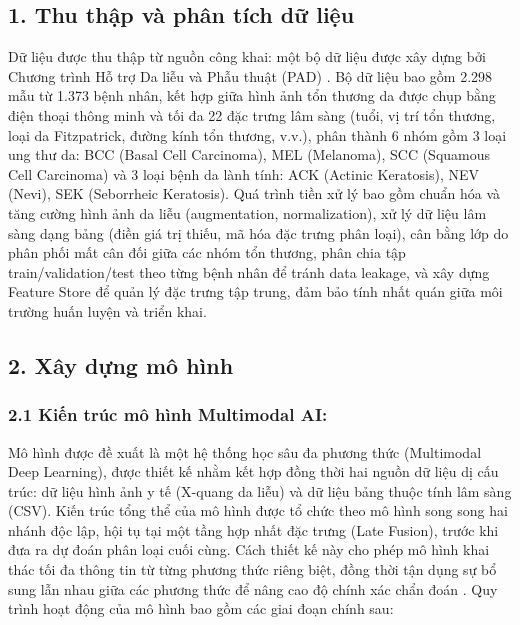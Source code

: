 
\subsection{1. Thu thập và phân tích dữ liệu} 

Dữ liệu được thu thập từ nguồn công khai: một bộ dữ liệu được xây dựng bởi Chương trình Hỗ trợ Da liễu và Phẫu thuật (PAD) \cite{mahdavi2022skincancer}. Bộ dữ liệu bao gồm 2.298 mẫu từ 1.373 bệnh nhân, kết hợp giữa hình ảnh tổn thương da được chụp bằng điện thoại thông minh và tối đa 22 đặc trưng lâm sàng (tuổi, vị trí tổn thương, loại da Fitzpatrick, đường kính tổn thương, v.v.), phân thành 6 nhóm gồm 3 loại ung thư da: BCC (Basal Cell Carcinoma), MEL (Melanoma), SCC (Squamous Cell Carcinoma) và 3 loại bệnh da lành tính: ACK (Actinic Keratosis), NEV (Nevi), SEK (Seborrheic Keratosis). Quá trình tiền xử lý bao gồm chuẩn hóa và tăng cường hình ảnh da liễu (augmentation, normalization), xử lý dữ liệu lâm sàng dạng bảng (điền giá trị thiếu, mã hóa đặc trưng phân loại), cân bằng lớp do phân phối mất cân đối giữa các nhóm tổn thương, phân chia tập train/validation/test theo từng bệnh nhân để tránh data leakage, và xây dựng Feature Store để quản lý đặc trưng tập trung, đảm bảo tính nhất quán giữa môi trường huấn luyện và triển khai.
   


\subsection{2. Xây dựng mô hình} 
\subsubsection{2.1 Kiến trúc mô hình Multimodal AI: }
Mô hình được đề xuất là một hệ thống học sâu đa phương thức (Multimodal Deep Learning), được thiết kế nhằm kết hợp đồng thời hai nguồn dữ liệu dị cấu trúc: dữ liệu hình ảnh y tế (X-quang da liễu) và dữ liệu bảng thuộc tính lâm sàng (CSV). Kiến trúc tổng thể của mô hình được tổ chức theo mô hình song song hai nhánh độc lập, hội tụ tại một tầng hợp nhất đặc trưng (Late Fusion), trước khi đưa ra dự đoán phân loại cuối cùng. Cách thiết kế này cho phép mô hình khai thác tối đa thông tin từ từng phương thức riêng biệt, đồng thời tận dụng sự bổ sung lẫn nhau giữa các phương thức để nâng cao độ chính xác chẩn đoán \cite{singh_multimodal_biometrics_2024}. Quy trình hoạt động của mô hình bao gồm các giai đoạn chính sau:


